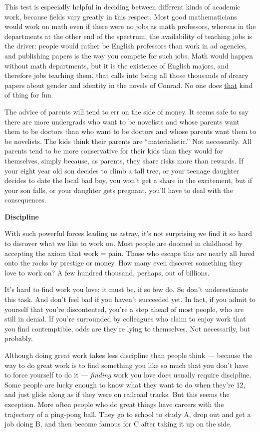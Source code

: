 \documentclass[12pt]{book}
\begin{document}
This test is especially helpful in deciding between different kinds of
academic work, because fields vary greatly in this respect. Most good
mathematicians would work on math even if there were no jobs as math
professors, whereas in the departments at the other end of the spectrum,
the availability of teaching jobs is the driver: people would rather be
English professors than work in ad agencies, and publishing papers is
the way you compete for such jobs. Math would happen without math
departments, but it is the existence of English majors, and therefore
jobs teaching them, that calls into being all those thousands of dreary
papers about gender and identity in the novels of Conrad. No one does
\href{http://www.google.com/scholar?q=gender+identity+narrative+discourse+transcend}{that}
kind of thing for fun.

The advice of parents will tend to err on the side of money. It seems
safe to say there are more undergrads who want to be novelists and whose
parents want them to be doctors than who want to be doctors and whose
parents want them to be novelists. The kids think their parents are
``materialistic.'' Not necessarily. All parents tend to be more
conservative for their kids than they would for themselves, simply
because, as parents, they share risks more than rewards. If your eight
year old son decides to climb a tall tree, or your teenage daughter
decides to date the local bad boy, you won't get a share in the
excitement, but if your son falls, or your daughter gets pregnant,
you'll have to deal with the consequences.

\textbf{Discipline}

With such powerful forces leading us astray, it's not surprising we find
it so hard to discover what we like to work on. Most people are doomed
in childhood by accepting the axiom that work = pain. Those who escape
this are nearly all lured onto the rocks by prestige or money. How many
even discover something they love to work on? A few hundred thousand,
perhaps, out of billions.

It's hard to find work you love; it must be, if so few do. So don't
underestimate this task. And don't feel bad if you haven't succeeded
yet. In fact, if you admit to yourself that you're discontented, you're
a step ahead of most people, who are still in denial. If you're
surrounded by colleagues who claim to enjoy work that you find
contemptible, odds are they're lying to themselves. Not necessarily, but
probably.

Although doing great work takes less discipline than people think ---
because the way to do great work is to find something you like so much
that you don't have to force yourself to do it --- \emph{finding} work
you love does usually require discipline. Some people are lucky enough
to know what they want to do when they're 12, and just glide along as if
they were on railroad tracks. But this seems the exception. More often
people who do great things have careers with the trajectory of a
ping-pong ball. They go to school to study A, drop out and get a job
doing B, and then become famous for C after taking it up on the side.
\end{document}
